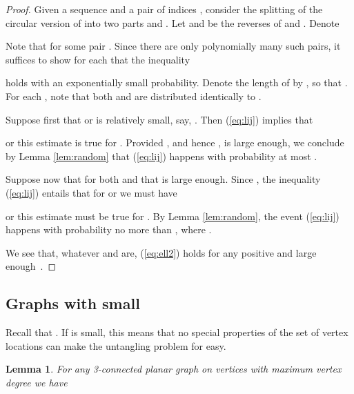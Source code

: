 \documentclass[reqno,12pt]{amsart}
\newtheorem{lemma}[theorem]{Lemma}
\newcommand{\refeq}[1]{(\ref{eq:#1})}
\begin{document}
\begin{proof}
Given a sequence  and a pair of indices ,
consider the splitting of the circular version of  into two parts
 and . Let 
and  be the reverses of  and .
Denote 

Note that  for some pair .
Since there are only polynomially many such pairs,
it suffices to show for each  that the inequality

holds with an exponentially small probability.
Denote the length of  by , so that . For each ,
note that both  and  are distributed identically to
.

Suppose first that  or  is relatively small, say, .
Then \refeq{lij} implies that 

or this estimate is true for . Provided , and hence , is large enough,
we conclude by Lemma \ref{lem:random} that \refeq{lij} happens with probability
at most .

Suppose now that  for both  and that  is large enough.
Since
,
the inequality \refeq{lij} entails that for  or  we must have

or this estimate must be true for . By Lemma \ref{lem:random}, the event \refeq{lij}
happens with probability no more than , 
where .

We see that, whatever  and  are, \refeq{ell2} holds for
any positive  and large enough~.
\end{proof}

\subsection{Graphs with small }\label{ss:FIX}

Recall that .
If  is small, this means that no special properties of the set
of vertex locations can make the untangling problem for  easy.

\begin{lemma}\label{lem:fixx}
For any 3-connected planar graph  on  vertices with maximum
vertex degree  we have

\end{lemma}
\end{document}
